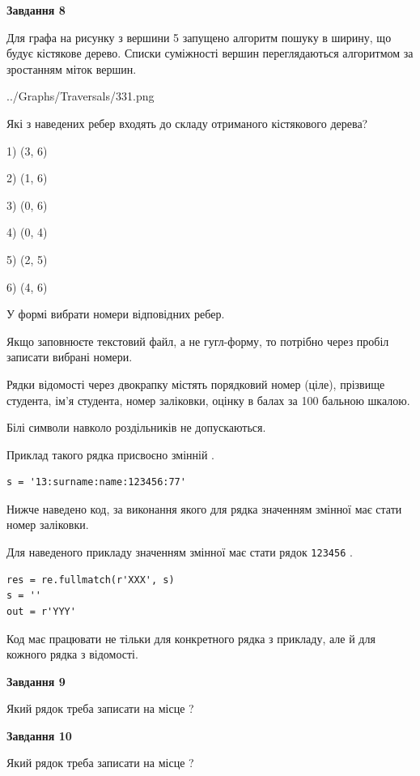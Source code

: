 \documentclass[12pt, ukrainian]{article}
\def\code#1{\Verb!#1!}
\begin{document}
{\begin {large}
{\begin {center}\textbf{Завдання 8}\end {center}}\par
Для графа на рисунку з вершини 5 запущено алгоритм пошуку в ширину, що будує кістякове дерево. Списки суміжності вершин переглядаються алгоритмом за зростанням міток вершин.\par
\begin{center}
	{../Graphs/Traversals/331.png}
\end{center}
\par Які з наведених ребер входять до складу отриманого кістякового дерева?\par
1) (3, 6)\par
2) (1, 6)\par
3) (0, 6)\par
4) (0, 4)\par
5) (2, 5)\par
6) (4, 6)\par
{\vskip 15pt} У формі вибрати номери відповідних ребер.


Якщо заповнюєте текстовий файл, а не гугл-форму, то потрібно через пробіл записа\-ти вибрані номери.\par
\newpage


Рядки відомості через двокрапку містять порядковий номер (ціле), пріз\-ви\-ще студен\-та, ім'я студента, номер заліковки, оцінку в балах за 100 бальною шкалою.

Білі символи навколо роздільників не допускаються.

Приклад такого рядка присвоєно змінній .



\begin{verbatim}
s = '13:surname:name:123456:77'
\end{verbatim}


Нижче наведено код, за виконання якого для рядка  значенням змінної  має стати номер заліковки.

Для наведеного прикладу значенням змінної  має стати рядок \code{123456} .



\begin{verbatim}
res = re.fullmatch(r'XXX', s)
s = ''
out = r'YYY'
\end{verbatim}


Код має працювати не тільки для конкретного рядка з прикладу, але й для кожного рядка з відомості.

{\begin {center}\textbf{Завдання 9}\end {center}}\par
Який рядок треба записати на місце  ?\par
\vspace{5mm}


{\begin {center}\textbf{Завдання 10}\end {center}}\par
Який рядок треба записати на місце  ?\par


\newpage


\end {large}}
\end{document}

